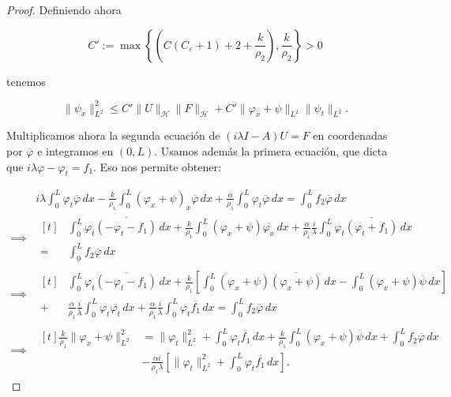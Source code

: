 \begin{proof}
    Definiendo ahora

    \[C' := \max \left\{\left(C\left(C_{\varepsilon} + 1\right) + 2 + \frac{k}{\rho_2}\right), \frac{k}{\rho_2} \right\} > 0 \]

    tenemos

    \[\lVert \psi_x \rVert_{L^2}^2 \leq C'\lVert U \rVert_{\mathcal{H}} \lVert F \rVert_{\mathcal{H}} + C'\lVert \varphi_x + \psi\rVert_{L^2}\lVert \psi_t \rVert_{L^2}.\]

    Multiplicamos ahora la segunda ecuación de $(i\lambda I - A)U = F$ en coordenadas por $\overline{\varphi}$ e integramos en $(0,L)$. Usamos además la primera ecuación, que dicta que $i\lambda \varphi - \varphi_t = f_1$. Eso nos permite obtener:

    \begin{align*}
        &i\lambda\int_0^L\varphi_t\overline{\varphi} \, dx - \frac{k}{\rho_1}\int_0^L(\varphi_{x} + \psi)_x\overline{\varphi} \, dx + \frac{\alpha}{\rho_1}\int_0^L\varphi_t\overline{\varphi} \, dx = \int_0^Lf_2\overline{\varphi} \, dx\\
        \implies&
        \begin{aligned}[t]
            &\int_0^L \varphi_t \overline{(-\varphi_t - f_1)} \, dx + \frac{k}{\rho_1}\int_0^L (\varphi_x + \psi) \overline{\varphi_x} \, dx + \frac{\alpha}{\rho_1}\frac{i}{\lambda}\int_0^L\varphi_t \overline{(\varphi_t + f_1)} \, dx\\
            =& \int_0^L f_2 \overline{\varphi} \, dx
        \end{aligned}\\
        \implies&
        \begin{aligned}[t]
            &\int_0^L \varphi_t \overline{(-\varphi_t - f_1)} \, dx + \frac{k}{\rho_1}\left[ \int_0^L(\varphi_x + \psi)\overline{(\varphi_x + \psi)} \, dx - \int_0^L(\varphi_x + \psi)\overline{\psi} \, dx \right]\\
            +& \frac{\alpha}{\rho_1}\frac{i}{\lambda} \int_0^L \varphi_t \overline{\varphi_t} \, dx + \frac{\alpha}{\rho_1}\frac{i}{\lambda} \int_0^L \varphi_t \overline{f_1} \, dx = \int_0^L f_2 \overline{\varphi} \, dx
        \end{aligned}\\
        \implies&
        \begin{aligned}[t]
            \frac{k}{\rho_1}\lVert \varphi_x + \psi \rVert_{L^2}^2 &= \lVert \varphi_t \rVert_{L^2}^2 + \int_0^L \varphi_t \overline{f_1} \, dx + \frac{k}{\rho_1}\int_0^L (\varphi_x + \psi)\overline{\psi} \, dx + \int_0^L f_2 \overline{\varphi} \, dx\\
            &- \frac{\alpha i}{\rho_1 \lambda} \left[\lVert \varphi_t \rVert_{L^2}^2 + \int_0^L \varphi_t \overline{f_1} \, dx \right].
        \end{aligned}
    \end{align*}


\end{proof}
